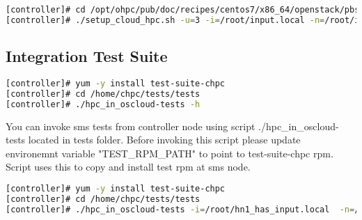 \begin{lstlisting}[language=bash,keywords={},upquote=true]
[controller]# cd /opt/ohpc/pub/doc/recipes/centos7/x86_64/openstack/pbs/
[controller]# ./setup_cloud_hpc.sh -u=3 -i=/root/input.local -n=/root/inventory
\end{lstlisting}

\newpage
\subsection{Integration Test Suite}
	


\begin{lstlisting}[language=bash,keywords={},upquote=true]
[controller]# yum -y install test-suite-chpc
[controller]# cd /home/chpc/tests/tests
[controller]# ./hpc_in_oscloud-tests -h
\end{lstlisting}
You can invoke sms tests from controller node using script ./hpc\_in\_oscloud-tests located in tests folder. Before invoking this script please update environemnt variable "TEST\_RPM\_PATH" to point to test-suite-chpc rpm. Script uses this to copy and install test rpm at sms node.

\begin{lstlisting}[language=bash,keywords={},upquote=true]
[controller]# yum -y install test-suite-chpc
[controller]# cd /home/chpc/tests/tests
[controller]# ./hpc_in_oscloud-tests -i=/root/hn1_has_input.local  -n=/root/hn1_has_inventory -rs
\end{lstlisting}



